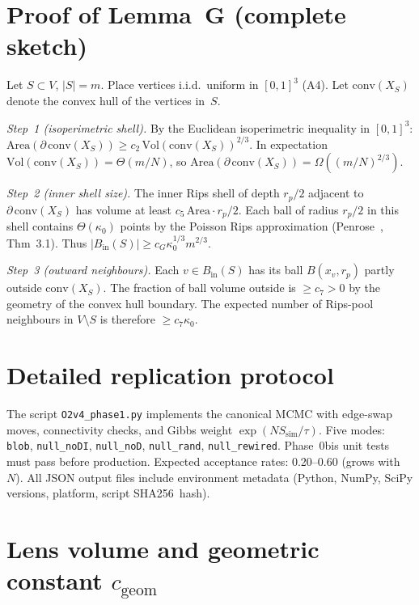 \documentclass[11pt, a4paper]{article}
\begin{document}
\appendix

\section{Proof of Lemma~G (complete sketch)}
\label{app:lemG}

Let $S\subset V$, $|S|=m$.
Place vertices i.i.d.\ uniform in $[0,1]^3$ (A4).
Let $\mathrm{conv}(X_S)$ denote the convex hull of the vertices in~$S$.

\textit{Step~1 (isoperimetric shell).}
By the Euclidean isoperimetric inequality in $[0,1]^3$:
$\mathrm{Area}(\partial\,\mathrm{conv}(X_S))\ge
c_2\,\mathrm{Vol}(\mathrm{conv}(X_S))^{2/3}$.
In expectation $\mathrm{Vol}(\mathrm{conv}(X_S))=\Theta(m/N)$,
so $\mathrm{Area}(\partial\,\mathrm{conv}(X_S))=\Omega((m/N)^{2/3})$.

\textit{Step~2 (inner shell size).}
The inner Rips shell of depth $r_p/2$ adjacent to
$\partial\,\mathrm{conv}(X_S)$ has volume at least
$c_5\,\mathrm{Area}\cdot r_p/2$.
Each ball of radius $r_p/2$ in this shell contains
$\Theta(\kappa_0)$ points by the Poisson Rips approximation
(Penrose~\cite{Penrose2003}, Thm~3.1).
Thus $|B_{\mathrm{in}}(S)|\ge c_G\kappa_0^{1/3}m^{2/3}$.

\textit{Step~3 (outward neighbours).}
Each $v\in B_{\mathrm{in}}(S)$ has its ball $B(x_v,r_p)$
partly outside $\mathrm{conv}(X_S)$.
The fraction of ball volume outside is $\ge c_7>0$ by the
geometry of the convex hull boundary.
The expected number of Rips-pool neighbours in $V\setminus S$
is therefore $\ge c_7\kappa_0$.

\section{Detailed replication protocol}
\label{app:protocol}

The script \texttt{O2v4\_phase1.py} implements the canonical MCMC
with edge-swap moves, connectivity checks, and Gibbs weight
$\exp(NS_{\mathrm{sim}}/\tau)$.
Five modes: \texttt{blob}, \texttt{null\_noDI}, \texttt{null\_noD},
\texttt{null\_rand}, \texttt{null\_rewired}.
Phase~0bis unit tests must pass before production.
Expected acceptance rates: 0.20--0.60 (grows with~$N$).
All JSON output files include environment metadata
(Python, NumPy, SciPy versions, platform, script SHA256~hash).

\section{Lens volume and geometric constant $c_{\mathrm{geom}}$}
\label{app:lens}
\end{document}

